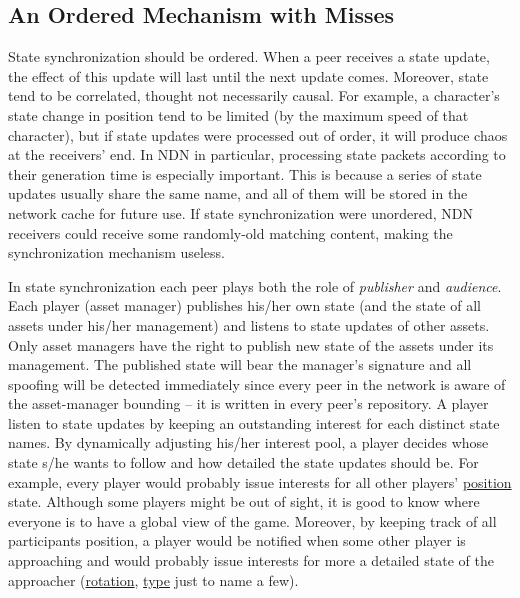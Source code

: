 \subsection{An Ordered Mechanism with Misses}
\label{orderedmiss}
State synchronization should be ordered. When a peer receives a state update, the effect of this update will last until the next update comes. Moreover, state tend to be correlated, thought not necessarily causal. For example, a character's state change in position tend to be limited (by the maximum speed of that character), but if state updates were processed out of order, it will produce chaos at the receivers' end. In NDN in particular, processing state packets according to their generation time is especially important. This is because a series of state updates usually share the same name, and all of them will be stored in the network cache for future use. If state synchronization were unordered, NDN receivers could receive some randomly-old matching content, making the synchronization mechanism useless.

In state synchronization each peer plays both the role of \emph{publisher} and \emph{audience}. Each player (asset manager) publishes his/her own state (and the state of all assets under his/her management) and listens to state updates of other assets. Only asset managers have the right to publish new state of the assets under its management. The published state will bear the manager's signature and all spoofing will be detected immediately since every peer in the network is aware of the asset-manager bounding -- it is written in every peer's repository. A player listen to state updates by keeping an outstanding interest for each distinct state names. By dynamically adjusting his/her interest pool, a player decides whose state s/he wants to follow and how detailed the state updates should be. For example, every player would probably issue interests for all other players' \url{position} state. Although some players might be out of sight, it is good to know where everyone is to have a global view of the game. Moreover, by keeping track of all participants position, a player would be notified when some other player is approaching and would probably issue interests for more a detailed state of the approacher (\url{rotation}, \url{type} just to name a few).


